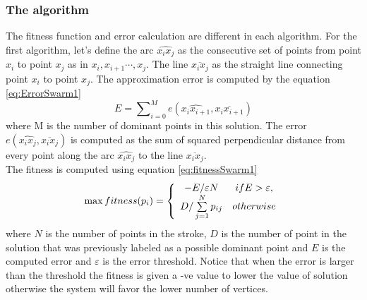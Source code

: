 \documentclass[a4paper,10pt]{IEEEconf}
\begin{document}
\subsubsection{The algorithm}
The fitness function and error calculation are different in each algorithm. For the first algorithm, 
let's define the arc $\widehat{x_ix_j}$ as the consecutive set of points from point$x_i$ to point $x_{j}$ as in $x_i,x_{i+1} \cdots,x_j$. The line $\overline{x_i x_j} $ as the straight line connecting point $x_i$ to point $x_j$. The approximation error is computed by the equation \ref{eq:ErrorSwarm1}
\begin{equation}
E=\sum\nolimits_{i = 0}^M e ( \widehat{x_ix_{i+1}},\overline{x_i x_{i+1}})
\label{eq:ErrorSwarm1}
\end{equation} where M is the number of dominant points in this solution.  The error $e ( \widehat{x_ix_j},\overline{x_i x_j})$ is computed as the sum of squared perpendicular distance from every point along the arc $\widehat{x_ix_j}$ to the line $\overline{x_i x_j}$.  \\
The fitness is computed using equation \ref{eq:fitnessSwarm1}\begin{equation}
\max fitness(p_i ) = \left\{ {\begin{array}{*{20}c}
   { - E/\varepsilon N} & {ifE > \varepsilon ,}  \\
   {D/\sum\limits_{j = 1}^N {p_{ij} } } & {otherwise}  \\
\end{array}} \right.
\label{eq:fitnessSwarm1}
\end{equation} where $N$ is the number of points in the stroke, $D$ is the number of point in the solution that was previously labeled as a possible dominant point and $E$ is the computed error and $\varepsilon$ is the error threshold.  Notice that when the error is larger than the threshold the fitness is given a -ve value to lower the value of solution otherwise the system will favor the lower number of vertices.\\ %
\end{document}
